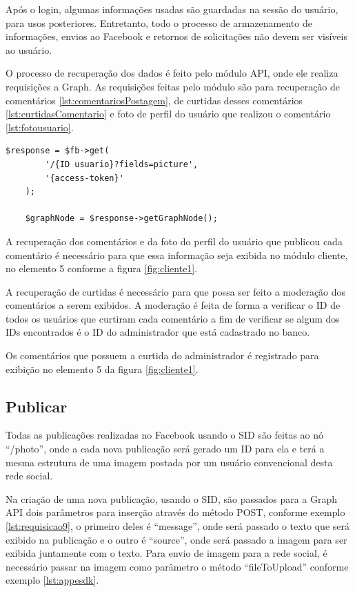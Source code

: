 Após o login, algumas informações usadas são guardadas na sessão do usuário, para usos posteriores. Entretanto, todo o processo de armazenamento de informações, envios ao Facebook e retornos de solicitações não devem ser visíveis ao usuário. 

O processo de recuperação dos dados é feito pelo módulo API, onde ele realiza requisições a Graph. As requisições feitas pelo módulo são para recuperação de comentários \ref{lst:comentariosPostagem}, de curtidas desses comentários \ref{lst:curtidasComentario} e foto de perfil do usuário que realizou o comentário \ref{lst:fotousuario}.

\begin{lstlisting}[caption={Foto de usuário},label={lst:fotousuario}]
  	$response = $fb->get(
    	'/{ID usuario}?fields=picture',
		'{access-token}'
	);
	
	$graphNode = $response->getGraphNode();
\end{lstlisting}

A recuperação dos comentários e da foto do perfil do usuário que publicou cada comentário é necessário para que essa informação seja exibida no módulo cliente, no elemento 5 conforme a figura \ref{fig:cliente1}.

A recuperação de curtidas é necessário para que possa ser feito a moderação dos comentários a serem exibidos. A moderação é feita de forma a verificar o ID de todos os usuários que curtiram cada comentário a fim de verificar se algum dos IDs encontrados é o ID do administrador que está cadastrado no banco.

Os comentários que possuem a curtida do administrador é registrado para exibição no elemento 5 da figura \ref{fig:cliente1}.

\subsection{Publicar}
Todas as publicações realizadas no Facebook usando o SID são feitas ao nó ``/photo'', onde a cada nova publicação será gerado um ID para ela e terá a mesma estrutura de uma imagem postada por um usuário convencional desta rede social.

Na criação de uma nova publicação, usando o SID, são passados para a Graph API dois parâmetros para inserção através do método POST, conforme exemplo \ref{lst:requisicao9}, o primeiro deles é “message”, onde será passado o texto que será exibido na publicação e o outro é “source”, onde será passado a imagem para ser exibida juntamente com o texto. Para envio de imagem para a rede social, é necessário passar na imagem como parâmetro o método “fileToUpload” conforme exemplo \ref{lst:appesdk}. 

